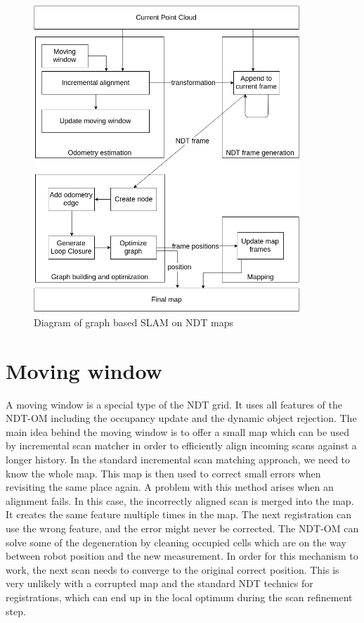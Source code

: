 \begin{figure}
	\centering
	\includegraphics[width=100mm]{../img/algorithm_runtime.png}
	\caption{Diagram of graph based SLAM on NDT maps}
	\label{fig:algorithm}
\end{figure}
  
\newpage


\section{Moving window}
\label{sec:window}
A moving window is a special type of the \gls{NDT} grid. It uses all features of the \gls{NDT-OM} including the occupancy update and the dynamic object rejection. The main idea behind the moving window is to offer a small map which can be used by incremental scan matcher in order to efficiently align incoming scans against a longer history. In the standard incremental scan matching approach, we need to know the whole map. This map is then used to correct small errors when revisiting the same place again. A problem with this method arises when an alignment fails. In this case, the incorrectly aligned scan is merged into the map. It creates the same feature multiple times in the map. The next registration can use the wrong feature, and the error might never be corrected. The \gls{NDT-OM} can solve some of the degeneration by cleaning occupied cells which are on the way between robot position and the new measurement. In order for this mechanism to work, the next scan needs to converge to the original correct position. This is very unlikely with a corrupted map and the standard NDT technics for registrations, which can end up in the local optimum during the scan refinement step.

